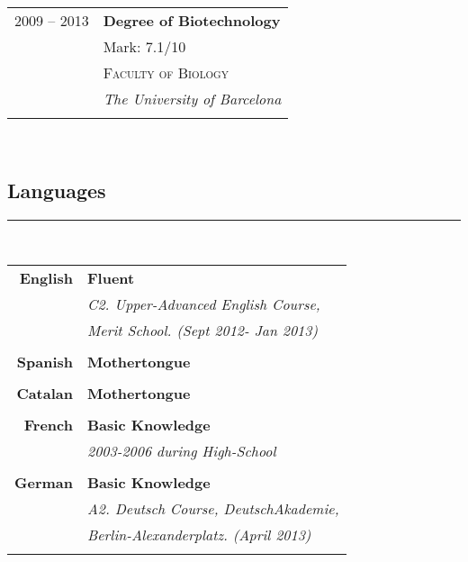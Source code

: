 \documentclass[10pt]{article} %
\begin{document}
\begin{minipage}[t]{0.44\textwidth}
\begin{tabular}{rl}

2009 -- 2013 & \textbf{Degree of Biotechnology} \\ 
& \small Mark: 7.1/10 \\
& \textsc{Faculty of Biology} \\ 
& \textit{The University of Barcelona}\\
&\\
	

\end{tabular}\\[5pt]


\begin{spacing}{0.0}
\section{Languages}
\end{spacing}
\rule{8cm}{0.4pt}
\\

\begin{tabular}{rl}
\textbf{English}	 & \textbf{Fluent}\\
& \textit{C2. Upper-Advanced English Course,}\\
& \textit{Merit School. (Sept 2012- Jan 2013)}\\ \\

\textbf{Spanish}	 & \textbf{Mothertongue}\\ \\

\textbf{Catalan}	 & \textbf{Mothertongue}\\ \\

\textbf{French}	 & \textbf{Basic Knowledge}\\
& \textit{2003-2006 during High-School}\\ \\

\textbf{German}	 & \textbf{Basic Knowledge}\\
& \textit{A2. Deutsch Course, DeutschAkademie,}\\
& \textit{Berlin-Alexanderplatz. (April 2013)}\\ \\


\end{tabular}
\end{minipage}
\end{document}
